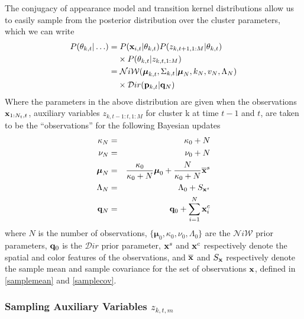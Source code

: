 \documentclass[twocolumn, final]{svjour3}
\begin{document}
The conjugacy of appearance model and transition kernel distributions allow us to easily sample from the posterior distribution over the cluster parameters, which we can write
\begin{align}
\begin{split}
P(\theta_{k,t} | \ldots ) = & \hspace{1mm} P(\bold{x}_{i,t} | \theta_{k,t}) P(z_{k,t+1,1:M} | \theta_{k,t})
\\ & \times P(\theta_{k,t} | z_{k,t,1:M}) \\
 = & \hspace{1mm} \mathcal{N}i\mathcal{W}(\boldsymbol{\mu}_{k,t}, \Sigma_{k,t} | \boldsymbol{\mu}_{N}, k_{N}, v_{N}, \Lambda_{N}) \\
  & \times \mathcal{D}ir( \bold{p}_{k,t} | \bold{q}_{N})
\end{split}
\end{align}
Where the parameters in the above distribution are given when the observations $\bold{x}_{1:N_{t},t}$, auxiliary variables $z_{k,t-1:t,1:M}$ for cluster k at time $t-1$ and $t$, are taken to be the ``observations'' for the following Bayesian updates
\begin{eqnarray}
\label{bayesian_update_1}
\kappa_{N} &=& \kappa_{0} + N \\
\label{bayesian_update_2}
\nu_{N} &=& \nu_{0} + N \\
\label{bayesian_update_3}
\boldsymbol{\mu}_{N} &=& \frac{\kappa_{0}}{\kappa_{0}+N} \boldsymbol{\mu}_{0}  +  \frac{N}{\kappa_{0}+N} \overline{\bold{x}}^{s}\\
\Lambda_{N} &=& \Lambda_{0} + S_{\bold{x}^{s}}\\
\label{bayesian_update_4}
\bold{q}_{N} &=& \bold{q}_{0} + \sum_{i=1}^{N} \bold{x}_{i}^{c}
\end{eqnarray}
where $N$ is the number of observations, $\{ \boldsymbol{\mu}_{0}, \kappa_{0}, \nu_{0}, \Lambda_{0} \}$ are the $\mathcal{N}i\mathcal{W}$ prior parameters, $\bold{q}_{0}$ is the $\mathcal{D}ir$ prior parameter, $\bold{x}^{s}$ and $\bold{x}^{c}$ respectively denote the spatial and color features of the observations, and $\overline{\bold{x}}$ and $S_{\bold{x}}$ respectively denote the sample mean and sample covariance for the set of observations $\bold{x}$, defined in \eqref{samplemean} and \eqref{samplecov}.




\subsubsection{Sampling Auxiliary Variables $z_{k,t,m}$}
\label{sec:sample_aux_vars}
\end{document}
